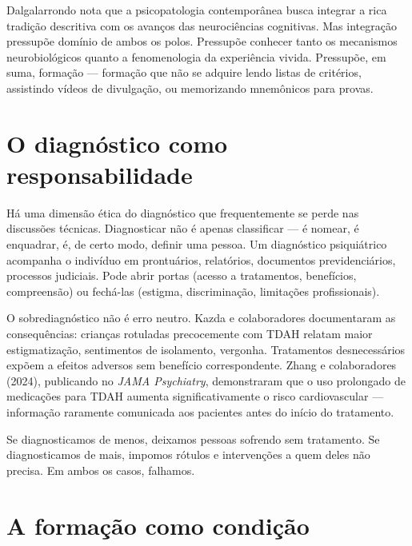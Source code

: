 Dalgalarrondo nota que a psicopatologia contemporânea busca integrar a rica tradição descritiva com os avanços das neurociências cognitivas. Mas integração pressupõe domínio de ambos os polos. Pressupõe conhecer tanto os mecanismos neurobiológicos quanto a fenomenologia da experiência vivida. Pressupõe, em suma, formação --- formação que não se adquire lendo listas de critérios, assistindo vídeos de divulgação, ou memorizando mnemônicos para provas.

\section{O diagnóstico como responsabilidade}
\label{sec:diagnostico-responsabilidade}

Há uma dimensão ética do diagnóstico que frequentemente se perde nas discussões técnicas. Diagnosticar não é apenas classificar --- é nomear, é enquadrar, é, de certo modo, definir uma pessoa. Um diagnóstico psiquiátrico acompanha o indivíduo em prontuários, relatórios, documentos previdenciários, processos judiciais. Pode abrir portas (acesso a tratamentos, benefícios, compreensão) ou fechá-las (estigma, discriminação, limitações profissionais).

O sobrediagnóstico não é erro neutro. Kazda e colaboradores documentaram as consequências: crianças rotuladas precocemente com TDAH relatam maior estigmatização, sentimentos de isolamento, vergonha. Tratamentos desnecessários expõem a efeitos adversos sem benefício correspondente. Zhang e colaboradores (2024), publicando no \textit{JAMA Psychiatry}, demonstraram que o uso prolongado de medicações para TDAH aumenta significativamente o risco cardiovascular --- informação raramente comunicada aos pacientes antes do início do tratamento.

Se diagnosticamos de menos, deixamos pessoas sofrendo sem tratamento. Se diagnosticamos de mais, impomos rótulos e intervenções a quem deles não precisa. Em ambos os casos, falhamos.

\section{A formação como condição}
\label{sec:formacao-condicao}

